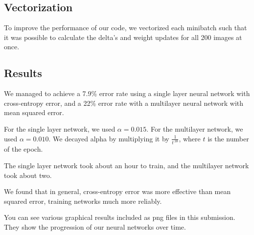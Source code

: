 \documentclass[11pt]{article}
\begin{document}
\subsection{Vectorization}
To improve the performance of our code, we vectorized each minibatch such that it was possible to calculate the delta's and weight updates for all 200 images at once.

\subsection{Results}
We managed to achieve a 7.9\% error rate using a single layer neural network with cross-entropy error, and a 22\% error rate with a multilayer neural network with mean squared error.

For the single layer network, we used $\alpha = 0.015$. For the multilayer network, we used $\alpha = 0.010$. We decayed alpha by multiplying it by $\frac{1}{t^{.38}}$, where $t$ is the number of the epoch. 

The single layer network took about an hour to train, and the multilayer network took about two. 

We found that in general, cross-entropy error was more effective than mean squared error, training networks much more reliably. 

You can see various graphical results included as png files in this submission. They show the progression of our neural networks over time. 
\end{document}
